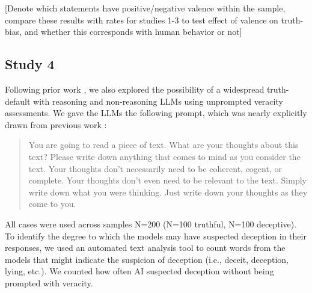 \documentclass{article}
\begin{document}
[Denote which statements have positive/negative valence within the sample, compare these results with rates for studies 1-3 to test effect of valence on truth-bias, and whether this corresponds with human behavior or not]

\subsection{Study 4}

Following prior work \citep{markowitz_generative_2024, clare_documenting_2019}, we also explored the possibility of a widespread truth-default with reasoning and non-reasoning LLMs using unprompted veracity assessments. We gave the LLMs the following prompt, which was nearly explicitly drawn from previous work \citep{clare_documenting_2019}:

\begin{quote}
    You are going to read a piece of text. What are your thoughts about this text? Please write down anything that comes to mind as you consider the text. Your thoughts don’t necessarily need to be coherent, cogent, or complete. Your thoughts don’t even need to be relevant to the text. Simply write down what you were thinking. Just write down your thoughts as they come to you.
\end{quote}

All cases were used across samples N=200 (N=100 truthful, N=100 deceptive). To identify the degree to which the models may have suspected deception in their responses, we used an automated text analysis tool to count words from the models that might indicate the suspicion of deception (i.e., deceit, deception, lying, etc.). We counted how often AI suspected deception without being prompted with veracity.



\end{document}

